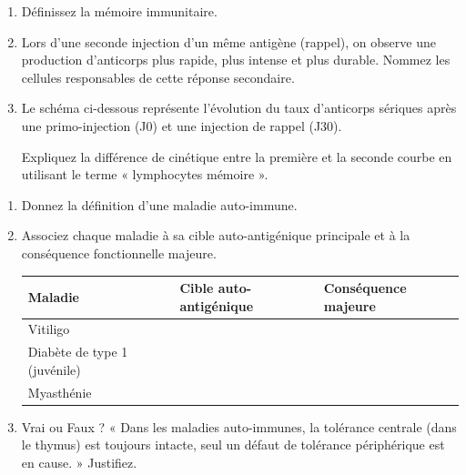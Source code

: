\documentclass[11pt]{article}
\begin{document}
\begin{exercice}
\begin{enumerate}
    \item Définissez la mémoire immunitaire.
    \item Lors d'une seconde injection d'un même antigène (rappel), on observe une production d'anticorps plus rapide, plus intense et plus durable. Nommez les cellules responsables de cette réponse secondaire.
    \item Le schéma ci-dessous représente l'évolution du taux d'anticorps sériques après une primo-injection (J0) et une injection de rappel (J30).
    \begin{center}
    \end{center}
    Expliquez la différence de cinétique entre la première et la seconde courbe en utilisant le terme « lymphocytes mémoire ».
\end{enumerate}
\end{exercice}

\begin{exercice}
\begin{enumerate}
    \item Donnez la définition d'une maladie auto-immune.
    \item Associez chaque maladie à sa cible auto-antigénique principale et à la conséquence fonctionnelle majeure.
    \begin{tabularx}{\linewidth}{|X|X|X|}
    \hline
    \textbf{Maladie} & \textbf{Cible auto-antigénique} & \textbf{Conséquence majeure} \\
    \hline
    Vitiligo & & \\
    \hline
    Diabète de type 1 (juvénile) & & \\
    \hline
    Myasthénie & & \\
    \hline
    \end{tabularx}
    \item Vrai ou Faux ? « Dans les maladies auto-immunes, la tolérance centrale (dans le thymus) est toujours intacte, seul un défaut de tolérance périphérique est en cause. » Justifiez.
\end{enumerate}
\end{exercice}
\end{document}
